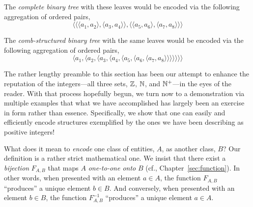 \smallskip

The {\em complete binary tree} with these leaves would be encoded via the following aggregation of ordered pairs,
\[
\langle
\langle \langle a_1,  a_2 \rangle, \langle a_3,  a_4 \rangle \rangle,
\langle \langle a_5,  a_6 \rangle, \langle a_7,  a_8 \rangle \rangle
\rangle
\]

\smallskip

The {\em comb-structured binary tree} with the same leaves would be encoded via the following aggregation of ordered pairs,
\[
\langle a_1, \langle a_2, \langle a_3, \langle a_4, \langle a_5,
\langle a_6, \langle a_7, a_8 \rangle \rangle \rangle \rangle
\rangle \rangle \rangle
\]

\bigskip

\noindent {}

\bigskip

The rather lengthy preamble to this section has been our attempt to enhance the reputation of the integers---all three sets, $\mathbb{Z}$, $\mathbb{N}$, and $\mathbb{N}^+$---in the eyes of the reader.  With that process hopefully begun, we turn now to a demonstration via multiple examples that what we have accomplished has largely been an exercise in form rather than essence.  Specifically, we show that one can easily and efficiently encode structures exemplified by the ones we have been describing
as positive integers!

\medskip

 
\noindent
What does it mean to {\em encode} one class of entities, $A$, as another class, $B$?  Our definition is a rather strict mathematical one.  We insist that there exist a {\em bijection} $F_{A,B}$ that maps $A$ {\em one-to-one onto} $B$ (cf., Chapter~\ref{sec:function}).  In other words, when presented with an element $a \in A$, the function $F_{A,B}$ ``produces'' a unique element $b \in B$.  And conversely, when presented with an element $b \in B$, the function $F^{-1}_{A,B}$ ``produces'' a unique element $a \in A$.

